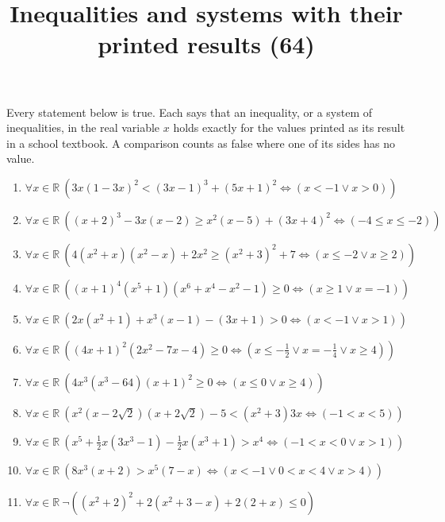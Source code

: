 \documentclass[11pt,a4paper]{article}
\title{Inequalities and systems with their printed results (64)}
\author{}
\date{}
\begin{document}
\maketitle
Every statement below is true. Each says that an inequality, or a system of inequalities, in the real variable $x$ holds exactly for the values printed as its result in a school textbook. A comparison counts as false where one of its sides has no value.

\begin{enumerate}
\item $\displaystyle \forall x \in \mathbb{R}\ \left( 3x(1 - 3x)^{2} < (3x - 1)^{3} + (5x + 1)^{2} \iff \left( x < -1 \lor x > 0 \right) \right)$
\item $\displaystyle \forall x \in \mathbb{R}\ \left( (x + 2)^{3} - 3x(x - 2) \ge x^{2}(x - 5) + (3x + 4)^{2} \iff \left( -4 \le x \le -2 \right) \right)$
\item $\displaystyle \forall x \in \mathbb{R}\ \left( 4(x^{2} + x)(x^{2} - x) + 2x^{2} \ge (x^{2} + 3)^{2} + 7 \iff \left( x \le -2 \lor x \ge 2 \right) \right)$
\item $\displaystyle \forall x \in \mathbb{R}\ \left( (x + 1)^{4}(x^{5} + 1)(x^{6} + x^{4} - x^{2} - 1) \ge 0 \iff \left( x \ge 1 \lor x = -1 \right) \right)$
\item $\displaystyle \forall x \in \mathbb{R}\ \left( 2x(x^{2} + 1) + x^{3}(x - 1) - (3x + 1) > 0 \iff \left( x < -1 \lor x > 1 \right) \right)$
\item $\displaystyle \forall x \in \mathbb{R}\ \left( (4x + 1)^{2}(2x^{2} - 7x - 4) \ge 0 \iff \left( x \le -\frac{1}{2} \lor x = -\frac{1}{4} \lor x \ge 4 \right) \right)$
\item $\displaystyle \forall x \in \mathbb{R}\ \left( 4x^{3}(x^{3} - 64)(x + 1)^{2} \ge 0 \iff \left( x \le 0 \lor x \ge 4 \right) \right)$
\item $\displaystyle \forall x \in \mathbb{R}\ \left( x^{2}(x - 2\sqrt{2})(x + 2\sqrt{2}) - 5 < (x^{2} + 3)3x \iff \left( -1 < x < 5 \right) \right)$
\item $\displaystyle \forall x \in \mathbb{R}\ \left( x^{5} + \frac{1}{2}x(3x^{3} - 1) - \frac{1}{2}x(x^{3} + 1) > x^{4} \iff \left( -1 < x < 0 \lor x > 1 \right) \right)$
\item $\displaystyle \forall x \in \mathbb{R}\ \left( 8x^{3}(x + 2) > x^{5}(7 - x) \iff \left( x < -1 \lor 0 < x < 4 \lor x > 4 \right) \right)$
\item $\displaystyle \forall x \in \mathbb{R}\ \lnot \left( (x^{2} + 2)^{2} + 2(x^{2} + 3 - x) + 2(2 + x) \le 0 \right)$

\end{enumerate}
\end{document}
